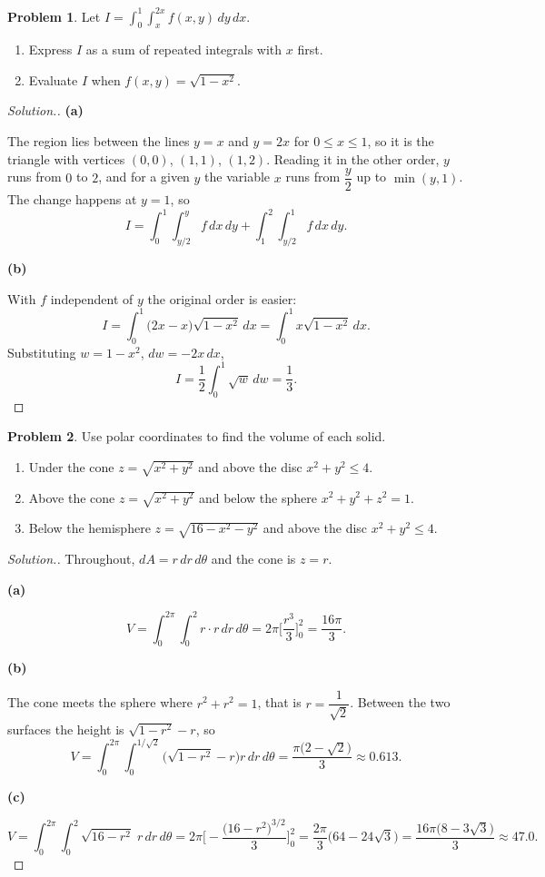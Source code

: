 \documentclass[11pt,a4paper]{article}
\theoremstyle{definition}
\newtheorem{problemx}{Problem}[subsection]
\newenvironment{problem}{\begin{problemx}}{\end{problemx}}
\newenvironment{solution}
  {\renewcommand{\qedsymbol}{}\begin{proof}[\textit{Solution}.]}
  {\end{proof}}
\newcommand{\subhead}[1]{%
  \par\medskip\noindent\textbf{#1}\par\nobreak\smallskip}
\begin{document}
\begin{problem}
Let $\displaystyle{I = \int_0^1\int_x^{2x}f(x,y)\,dy\,dx}$.
\begin{enumerate}
\item[(a)] Express $I$ as a sum of repeated integrals with $x$ first.
\item[(b)] Evaluate $I$ when $f(x,y) = \sqrt{1-x^2}$.
\end{enumerate}
\end{problem}
\begin{solution}
\subhead{(a)}
The region lies between the lines $y=x$ and $y=2x$ for $0\leq x\leq 1$, so it is
the triangle with vertices $(0,0)$, $(1,1)$, $(1,2)$. Reading it in the other
order, $y$ runs from $0$ to $2$, and for a given $y$ the variable $x$ runs from
$\dfrac{y}{2}$ up to $\min(y,1)$. The change happens at $y=1$, so
$$I = \int_0^1\int_{y/2}^{y}f\,dx\,dy + \int_1^2\int_{y/2}^{1}f\,dx\,dy .$$

\subhead{(b)}
With $f$ independent of $y$ the original order is easier:
$$I = \int_0^1\big(2x-x\big)\sqrt{1-x^2}\,dx = \int_0^1x\sqrt{1-x^2}\,dx .$$
Substituting $w = 1-x^2$, $dw = -2x\,dx$,
$$I = \frac12\int_0^1\sqrt w\,dw = \frac13 .$$
\end{solution}

\begin{problem}
Use polar coordinates to find the volume of each solid.
\begin{enumerate}
\item[(a)] Under the cone $z = \sqrt{x^2+y^2}$ and above the disc
$x^2+y^2\leq 4$.
\item[(b)] Above the cone $z = \sqrt{x^2+y^2}$ and below the sphere
$x^2+y^2+z^2 = 1$.
\item[(c)] Below the hemisphere $z = \sqrt{16-x^2-y^2}$ and above the disc
$x^2+y^2\leq 4$.
\end{enumerate}
\end{problem}
\begin{solution}
Throughout, $dA = r\,dr\,d\theta$ and the cone is $z = r$.

\subhead{(a)}
$$V = \int_0^{2\pi}\int_0^2 r\cdot r\,dr\,d\theta
= 2\pi\Big[\frac{r^3}{3}\Big]_0^2 = \frac{16\pi}{3}.$$

\subhead{(b)}
The cone meets the sphere where $r^2+r^2 = 1$, that is
$r = \dfrac{1}{\sqrt2}$. Between the two surfaces the height is
$\sqrt{1-r^2}-r$, so
$$V = \int_0^{2\pi}\int_0^{1/\sqrt2}\Big(\sqrt{1-r^2}-r\Big)r\,dr\,d\theta
= \frac{\pi\big(2-\sqrt2\big)}{3}\approx 0.613 .$$

\subhead{(c)}
$$V = \int_0^{2\pi}\int_0^2\sqrt{16-r^2}\;r\,dr\,d\theta
= 2\pi\Big[-\frac{\big(16-r^2\big)^{3/2}}{3}\Big]_0^2
= \frac{2\pi}{3}\Big(64-24\sqrt3\Big) = \frac{16\pi\big(8-3\sqrt3\big)}{3}
\approx 47.0 .$$
\end{solution}
\end{document}
